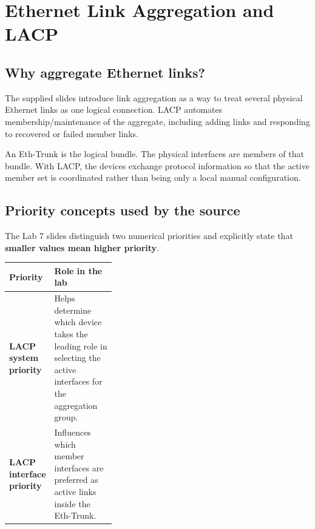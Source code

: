 \chapter{Ethernet Link Aggregation and LACP}

\section{Why aggregate Ethernet links?}
The supplied slides introduce link aggregation as a way to treat several physical Ethernet links as one logical connection. LACP automates membership/maintenance of the aggregate, including adding links and responding to recovered or failed member links.



\begin{keyidea}
An Eth-Trunk is the logical bundle. The physical interfaces are members of that bundle. With LACP, the devices exchange protocol information so that the active member set is coordinated rather than being only a local manual configuration.
\end{keyidea}

\section{Priority concepts used by the source}
The Lab 7 slides distinguish two numerical priorities and explicitly state that \textbf{smaller values mean higher priority}.

\begin{tabularx}{\linewidth}{>{\bfseries}p{0.35\linewidth}X}
\toprule
Priority & Role in the lab\\\midrule
LACP system priority & Helps determine which device takes the leading role in selecting the active interfaces for the aggregation group.\\
LACP interface priority & Influences which member interfaces are preferred as active links inside the Eth-Trunk.\\\bottomrule
\end{tabularx}

